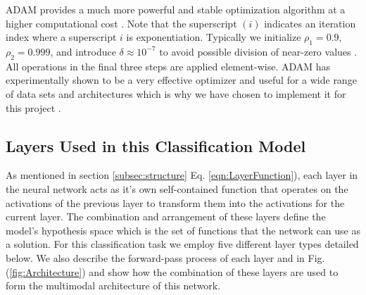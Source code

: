 \documentclass[conference,onecolumn,letterpaper]{IEEEtran}
\begin{document}
ADAM provides a much more powerful and stable optimization algorithm at a higher computational cost \cite{Geron}. Note that the superscript $(i)$ indicates an iteration index where a superscript $i$ is exponentiation. Typically we initialize $\rho_1 = 0.9$, $\rho_2 = 0.999$, and introduce $\delta \approx 10^{-7}$ to avoid possible division of near-zero values \cite{Goodfellow}. All operations in the final three steps are applied element-wise. ADAM has experimentally shown to be a very effective optimizer and useful for a wide range of data sets and architectures which is why we have chosen to implement it for this project \cite{Geron,Goodfellow}.


\subsection{Layers Used in this Classification Model}
\label{sec:LayersUsed}

As mentioned in section \ref{subsec:structure} Eq. \ref{eqn:LayerFunction}), each layer in the neural network acts as it's own self-contained function that operates on the activations of the previous layer to transform them into the activations for the current layer. The combination and arrangement of these layers define the model's hypothesis space which is the set of functions that the network can use as a solution. For this classification task we employ five different layer types detailed below. We also describe the forward-pass process of each layer and in Fig. (\ref{fig:Architecture}) and show how the combination of these layers are used to form the multimodal architecture of this network. 
\end{document}
